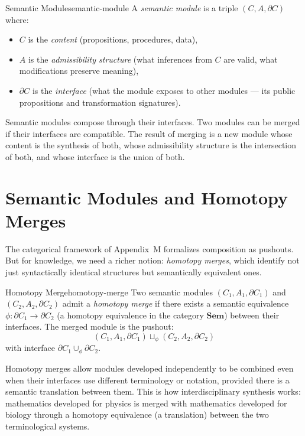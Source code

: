 \begin{definition}{Semantic Module}{semantic-module}
  A \emph{semantic module} is a triple $(C, A, \partial C)$ where:
  \begin{itemize}
    \item $C$ is the \emph{content} (propositions, procedures, data),
    \item $A$ is the \emph{admissibility structure} (what inferences
          from $C$ are valid, what modifications preserve meaning),
    \item $\partial C$ is the \emph{interface} (what the module exposes
          to other modules — its public propositions and transformation
          signatures).
  \end{itemize}
\end{definition}

Semantic modules compose through their interfaces. Two modules can be
merged if their interfaces are compatible. The result of merging is a
new module whose content is the synthesis of both, whose admissibility
structure is the intersection of both, and whose interface is the
union of both.

\section{Semantic Modules and Homotopy Merges}

The categorical framework of Appendix~M formalizes composition as
pushouts. But for knowledge, we need a richer notion: \emph{homotopy
merges}, which identify not just syntactically identical structures
but semantically equivalent ones.

\begin{definition}{Homotopy Merge}{homotopy-merge}
  Two semantic modules $(C_1, A_1, \partial C_1)$ and $(C_2, A_2,
  \partial C_2)$ admit a \emph{homotopy merge} if there exists a
  semantic equivalence $\phi : \partial C_1 \to \partial C_2$
  (a homotopy equivalence in the category $\mathbf{Sem}$) between
  their interfaces. The merged module is the pushout:
  \[
    (C_1, A_1, \partial C_1) \sqcup_\phi (C_2, A_2, \partial C_2)
  \]
  with interface $\partial C_1 \cup_\phi \partial C_2$.
\end{definition}

Homotopy merges allow modules developed independently to be combined
even when their interfaces use different terminology or notation,
provided there is a semantic translation between them. This is how
interdisciplinary synthesis works: mathematics developed for physics
is merged with mathematics developed for biology through a homotopy
equivalence (a translation) between the two terminological systems.

